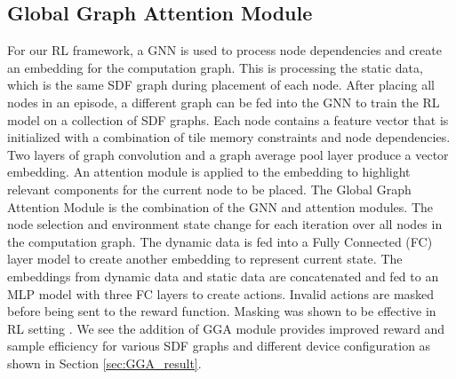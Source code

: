 \subsection{Global Graph Attention Module}
For our RL framework, a GNN is used to process node dependencies and create an embedding for the computation graph.
This is processing the static data, which is the same SDF graph during placement of each node. 
After placing all nodes in an episode, a different graph can be fed into the GNN to train the RL model on a collection of SDF graphs. 
Each node contains a feature vector that is initialized with a combination of tile memory constraints and node dependencies. 
Two layers of graph convolution \cite{wu2019simplifying} and a graph average pool layer produce a vector embedding.
An attention module is applied to the embedding to highlight relevant components for the current node to be placed. 
The Global Graph Attention Module is the combination of the GNN and attention modules.
The node selection and environment state change for each iteration over all nodes in the computation graph. 
The dynamic data is fed into a Fully Connected (FC) layer model to create another embedding to represent current state. 
The embeddings from dynamic data and static data are concatenated and fed to an MLP model with three FC layers to create actions. 
Invalid actions are masked before being sent to the reward function. 
Masking was shown to be effective in RL setting \cite{Shengyi_mask}.
We see the addition of GGA module provides improved reward and sample efficiency for various SDF graphs and different device configuration as shown in Section \ref{sec:GGA_result}.


